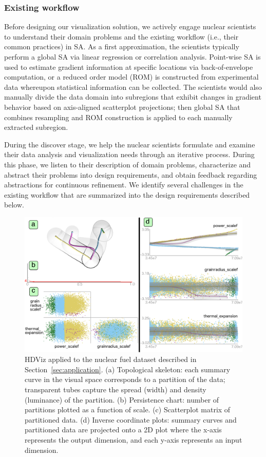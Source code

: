 \subsubsection{Existing workflow}
Before designing our visualization solution, we actively engage nuclear scientists to understand their domain problems and the existing workflow (i.e., their common practices) in SA.
%
As a first approximation, the scientists typically perform a global SA via linear regression or correlation analysis.
%
Point-wise SA is used to estimate gradient information at specific locations via back-of-envelope computation, or a reduced order model (ROM) is constructed from experimental data whereupon statistical information can be collected.
%
The scientists would also manually divide the data domain into subregions that exhibit changes in gradient behavior based on axis-aligned scatterplot projections; then global SA that combines resampling and ROM construction is applied to each manually extracted subregion.

During the discover stage, we help the nuclear scientists formulate and examine their data analysis and visualization needs through an iterative process.
%
During this phase, we listen to their description of domain problems, characterize and abstract their problems into design requirements, and obtain feedback regarding abstractions for continuous refinement.
%
We identify several challenges in the existing workflow that are summarized into the design requirements described below.

\begin{figure}[!h]
  \centering
  \includegraphics[width=1.0\linewidth]{figs/chap6/HDViz-original}
  \caption{HDViz applied to the nuclear fuel
  dataset described in Section~\ref{sec:application}.
  (a) Topological skeleton: each summary curve in the visual space corresponds to a partition of the data; transparent tubes capture the spread (width) and density (luminance) of the partition.
  (b) Persistence chart: number of partitions plotted as a function of scale.
  (c) Scatterplot matrix of partitioned data.
  (d) Inverse coordinate plots: summary curves and partitioned data are projected onto a 2D plot where the x-axis represents the output dimension, and each y-axis
  represents an input dimension. }
  \label{fig:hdviz}
\end{figure}

